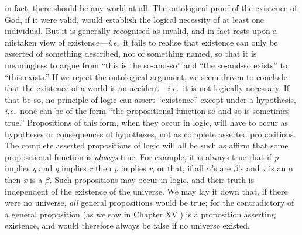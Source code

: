 {in fact, there should be any world at all. The ontological proof
of the existence of God, if it were valid, would establish the logical
necessity of at least one individual. But it is generally recognised as
invalid, and in fact rests upon a mistaken view of existence---\textit{i.e.}\ it
fails to realise that existence can only be asserted of something
described, not of something named, so that it is meaningless to argue
from ``this is the so-and-so'' and ``the so-and-so exists'' to ``this
exists.'' If we reject the ontological   argument, we seem driven to
conclude that the existence of a world is an accident---\textit{i.e.}\ it is not
logically necessary. If that be so, no principle of logic can assert
``existence'' except under a hypothesis, \textit{i.e.}\ none can be of
the form
``the propositional function so-and-so is sometimes true.'' Propositions
of this form, when they occur in logic, will have to occur as
hypotheses or consequences of hypotheses, not as complete asserted
propositions. The complete asserted propositions of logic will all be
such
as affirm that some propositional function is \textit{always} true. For
example, it is always true that if \textit{p}
implies \textit{q}
and \textit{q}
implies \textit{r}
then
\textit{p}
implies \textit{r},
or that, if all
\ensuremath{\alpha}'s are \ensuremath{\beta}'s and \textit{x}
is an \ensuremath{\alpha} then \textit{x}
is a \ensuremath{\beta}.
Such propositions may occur in logic, and their truth is independent of
the existence of the universe. We may lay it down that, if there were
no universe, \textit{all}
general propositions would be true; for the
contradictory of a general proposition (as we saw in Chapter XV.) is a
proposition asserting existence, and would therefore always be false if
no universe existed.}
